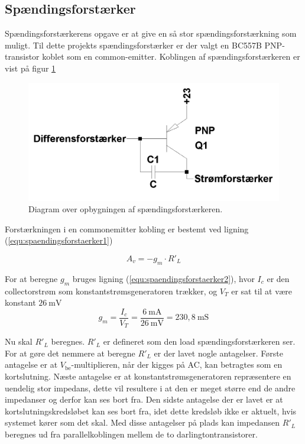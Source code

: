 \subsection{Spændingsforstærker}
\label{effekt_spaendingsforstaerker}
Spændingsforstærkerens opgave er at give en så stor spændingsforstærkning som muligt. Til dette projekts spændingsforstærker er der valgt en BC557B PNP-transistor koblet som en common-emitter. Koblingen af spændingsforstærkeren er vist på figur \ref{spaendingsforstaerker_diagram}

\begin{figure}[h]
\centering
\includegraphics[scale=0.2]{teknisk/effektforstaerker/spaendingsforstaerker_diagram.png}
\caption{Diagram over opbygningen af spændingsforstærkeren.}
\label{spaendingsforstaerker_diagram}
\end{figure}

Forstærkningen i en commonemitter kobling er bestemt ved ligning (\ref{equ:spaendingsforstaerker1}) \cite{ael-mm7}%

\begin{equation}
\label{equ:spaendingsforstaerker1}
A_v = -g_m \cdot R'_L
\end{equation}

For at beregne $g_m$ bruges ligning (\ref{equ:spaendingsforstaerker2}), hvor $I_c$ er den collectorstrøm som konstantstrømsgeneratoren trækker, og $V_T$ er sat til at være konstant $26~\mathrm{mV}$
\begin{equation}
\label{equ:spaendingsforstaerker2}
g_m = \frac{I_c}{V_T} = \frac{6~\mathrm{mA}}{26~\mathrm{mV}} = 230,8~\mathrm{mS}
\end{equation}

Nu skal $R'_L$ beregnes. $R'_L$ er defineret som den load spændingsforstærkeren ser. For at gøre det nemmere at beregne $R'_L$ er der lavet nogle antagelser. Første antagelse er at $V_\mathrm{be}$-multiplieren, når der kigges på AC, kan betragtes som en kortslutning. Næste antagelse er at konstantstrømsgeneratoren repræsentere en uendelig stor impedans, dette vil resultere i at den er meget større end de andre impedanser og derfor kan ses bort fra. Den sidste antagelse der er lavet er at kortslutningskredsløbet kan ses bort fra, idet dette kredsløb ikke er aktuelt, hvis systemet  kører som det skal. Med disse antagelser på plads kan impedansen $R'_L$ beregnes ud fra parallelkoblingen mellem de to darlingtontransistorer.

